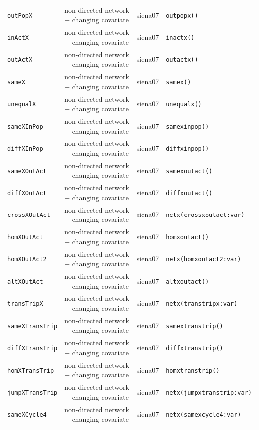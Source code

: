 \begin{longtable}{@{}p{2.6cm}p{3.2cm}p{2.9cm}p{5.4cm}@{}}
\texttt{outPopX} & non-directed network + changing covariate & siena07 & \texttt{outpopx()}\\
\texttt{inActX} & non-directed network + changing covariate & siena07 & \texttt{inactx()}\\
\texttt{outActX} & non-directed network + changing covariate & siena07 & \texttt{outactx()}\\
\texttt{sameX} & non-directed network + changing covariate & siena07 & \texttt{samex()}\\
\texttt{unequalX} & non-directed network + changing covariate & siena07 & \texttt{unequalx()}\\
\texttt{sameXInPop} & non-directed network + changing covariate & siena07 & \texttt{samexinpop()}\\
\texttt{diffXInPop} & non-directed network + changing covariate & siena07 & \texttt{diffxinpop()}\\
\texttt{sameXOutAct} & non-directed network + changing covariate & siena07 & \texttt{samexoutact()}\\
\texttt{diffXOutAct} & non-directed network + changing covariate & siena07 & \texttt{diffxoutact()}\\
\texttt{crossXOutAct} & non-directed network + changing covariate & siena07 & \texttt{netx(crossxoutact:var)}\\
\texttt{homXOutAct} & non-directed network + changing covariate & siena07 & \texttt{homxoutact()}\\
\texttt{homXOutAct2} & non-directed network + changing covariate & siena07 & \texttt{netx(homxoutact2:var)}\\
\texttt{altXOutAct} & non-directed network + changing covariate & siena07 & \texttt{altxoutact()}\\
\texttt{transTripX} & non-directed network + changing covariate & siena07 & \texttt{netx(transtripx:var)}\\
\texttt{sameXTransTrip} & non-directed network + changing covariate & siena07 & \texttt{samextranstrip()}\\
\texttt{diffXTransTrip} & non-directed network + changing covariate & siena07 & \texttt{diffxtranstrip()}\\
\texttt{homXTransTrip} & non-directed network + changing covariate & siena07 & \texttt{homxtranstrip()}\\
\texttt{jumpXTransTrip} & non-directed network + changing covariate & siena07 & \texttt{netx(jumpxtranstrip:var)}\\
\texttt{sameXCycle4} & non-directed network + changing covariate & siena07 & \texttt{netx(samexcycle4:var)}\\

\end{longtable}
